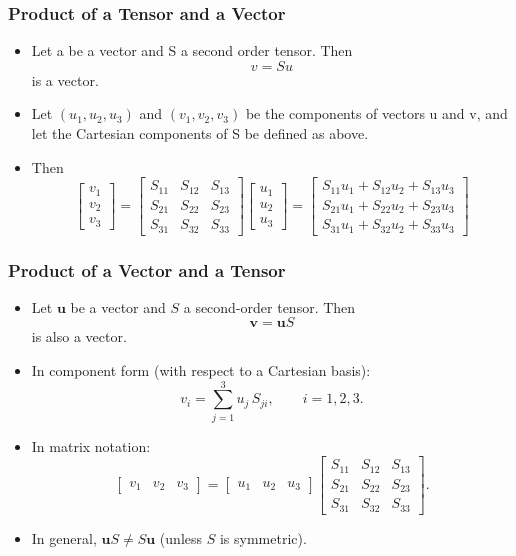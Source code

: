 \documentclass{beamer}
\begin{document}
\begin{frame}
\frametitle{Product of a Tensor and a Vector}
\begin{itemize}
    \item Let a be a vector and S a second order tensor.  Then
    \[
    v = S u
    \]
    is a vector. 
    \item Let \((u_1, u_2, u_3)\) and \((v_1, v_2, v_3)\) be the components of vectors u and v, and let the Cartesian components of S be defined as above. 
    \item Then
    \[
    \begin{bmatrix}
        v_1 \\
        v_2 \\
        v_3
    \end{bmatrix} =
    \begin{bmatrix}
        S_{11} & S_{12} & S_{13} \\
        S_{21} & S_{22} & S_{23} \\
        S_{31} & S_{32} & S_{33}
    \end{bmatrix}
    \begin{bmatrix}
        u_1 \\
        u_2 \\
        u_3
    \end{bmatrix} =
    \begin{bmatrix}
        S_{11} u_1 + S_{12} u_2 + S_{13}u_3 \\
        S_{21} u_1 + S_{22} u_2 + S_{23}u_3 \\
        S_{31} u_1 + S_{32} u_2 + S_{33}u_3
    \end{bmatrix}
    \]
\end{itemize}
\end{frame}

\begin{frame}
\frametitle{Product of a Vector and a Tensor}
\begin{itemize}
    \item Let $\mathbf{u}$ be a vector and $S$ a second-order tensor. Then
    \[
      \mathbf{v} = \mathbf{u} S
    \]
    is also a vector.
    \item In component form (with respect to a Cartesian basis):
    \[
      v_i = \sum_{j=1}^3 u_j\, S_{ji}, \qquad i = 1,2,3.
    \]
    \item In matrix notation:
    \[
      \begin{bmatrix} v_1 & v_2 & v_3 \end{bmatrix}
      =
      \begin{bmatrix} u_1 & u_2 & u_3 \end{bmatrix}
      \begin{bmatrix}
        S_{11} & S_{12} & S_{13} \\
        S_{21} & S_{22} & S_{23} \\
        S_{31} & S_{32} & S_{33}
      \end{bmatrix}.
    \]
    \item In general, $\mathbf{u} S \neq S \mathbf{u}$ (unless $S$ is symmetric).
\end{itemize}
\end{frame}
\end{document}
